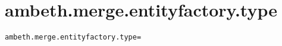 \section{ambeth.merge.entityfactory.type}
\label{configuration:AmbethMergeEntityfactoryType}
\ClearAPI
\TODO
{}
\begin{lstlisting}[style=Props,caption={Usage example for \textit{ambeth.merge.entityfactory.type}}]
ambeth.merge.entityfactory.type=
\end{lstlisting}